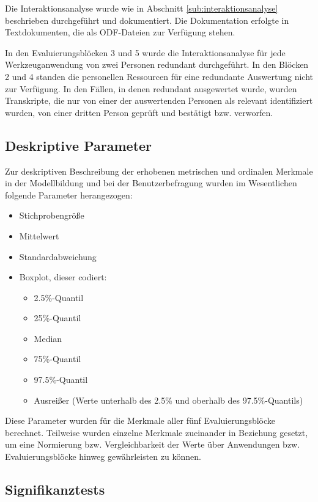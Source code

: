 Die Interaktionsanalyse wurde wie in Abschnitt \ref{sub:interaktionsanalyse} beschrieben durchgeführt und dokumentiert. Die Dokumentation erfolgte in Textdokumenten, die als \gls{ODF}-Dateien zur Verfügung stehen.

In den Evaluierungsblöcken 3 und 5 wurde die Interaktionsanalyse für jede Werkzeuganwendung von zwei Personen redundant durchgeführt. In den Blöcken 2 und 4 standen die personellen Ressourcen für eine redundante Auswertung nicht zur Verfügung. In den Fällen, in denen redundant ausgewertet wurde, wurden Transkripte, die nur von einer der auswertenden Personen als relevant identifiziert wurden, von einer dritten Person geprüft und bestätigt bzw. verworfen.

\subsection{Deskriptive Parameter} %
\label{sub:deskriptive_parameter}

Zur deskriptiven Beschreibung der erhobenen metrischen und ordinalen Merkmale in der Modellbildung und bei der Benutzerbefragung wurden im Wesentlichen folgende Parameter herangezogen:

\begin{itemize}
	\item Stichprobengröße
	\item Mittelwert
	\item Standardabweichung
	\item Boxplot, dieser codiert:
		\begin{itemize}
			\item 2.5\%-Quantil
			\item 25\%-Quantil
			\item Median
			\item 75\%-Quantil
			\item 97.5\%-Quantil
			\item Ausreißer (Werte unterhalb des 2.5\% und oberhalb des 97.5\%-Quantils)
		\end{itemize}
\end{itemize}

Diese Parameter wurden für die Merkmale aller fünf Evaluierungsblöcke berechnet. Teilweise wurden einzelne Merkmale zueinander in Beziehung gesetzt, um eine Normierung bzw. Vergleichbarkeit der Werte über Anwendungen bzw. Evaluierungsblöcke hinweg gewährleisten zu können.

\subsection{Signifikanztests} %
\label{sub:signifikanztests_fb2}

